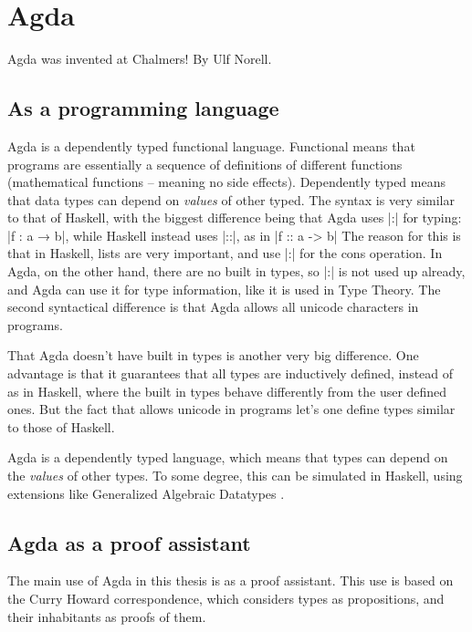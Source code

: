 \section{Agda}
Agda was invented at Chalmers! By Ulf Norell.
\subsection{As a programming language}

Agda is a dependently typed functional language. Functional means that programs are essentially a sequence of definitions of different functions (mathematical functions -- meaning no side effects). Dependently typed means that data types can depend on \emph{values} of other typed. The syntax is very similar to that of Haskell, with the biggest difference being that Agda uses |:| for typing: |f : a → b|, while Haskell instead uses |::|, as in |f :: a -> b|
The reason for this is that in Haskell, lists are very important, and use |:| for the cons operation. In Agda, on the other hand, there are no built in types, so |:| is not used up already, and Agda can use it for type information, like it is used in Type Theory. The second syntactical difference is that Agda allows all unicode  characters in programs.


That Agda doesn't have built in types is another very big difference. One advantage is that it guarantees that all types are inductively defined, instead of as in Haskell, where the built in types behave differently from the user defined ones. But the fact that allows unicode in programs let's one define types similar to those of Haskell.



Agda is a dependently typed language, which means that types can depend on the \emph{values} of other types. To some degree, this can be simulated in Haskell, using extensions like Generalized Algebraic Datatypes .

\subsection{Agda as a proof assistant}
The main use of Agda in this thesis is as a proof assistant. This use is based on the Curry Howard correspondence, which considers types as propositions, and their inhabitants as proofs of them.

